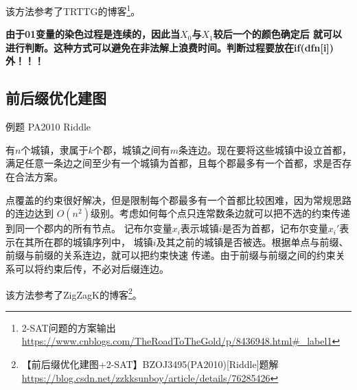 该方法参考了TRTTG的博客\footnote{2-SAT问题的方案输出
\url{https://www.cnblogs.com/TheRoadToTheGold/p/8436948.html\#\_label1}}。

{\bfseries 由于01变量的染色过程是连续的，因此当$X_0$与$X_1$较后一个的颜色确定后
就可以进行判断。这种方式可以避免在非法解上浪费时间。判断过程要放在if(dfn[i])外！！！}
\subsection{前后缀优化建图}
例题 PA2010 Riddle

有$n$个城镇，隶属于$k$个郡，城镇之间有$m$条连边。现在要将这些城镇中设立首都，
满足任意一条边之间至少有一个城镇为首都，且每个郡最多有一个首都，求是否存在合法方案。

点覆盖的约束很好解决，但是限制每个郡最多有一个首都比较困难，因为常规思路的连边达到
$O(n^2)$级别。考虑如何每个点只连常数条边就可以把不选的约束传递到同一个郡内的所有节点。
记布尔变量$x_i$表示城镇$i$是否为首都，记布尔变量$x_i'$表示在其所在郡的城镇序列中，
城镇$i$及其之前的城镇是否被选。根据单点与前缀、前缀与前缀的关系连边，就可以把约束快速
传递。由于前缀与前缀之间的约束关系可以将约束后传，不必对后缀连边。

该方法参考了ZigZagK的博客\footnote{
    【前后缀优化建图+2-SAT】BZOJ3495(PA2010)[Riddle]题解\\
    \url{https://blog.csdn.net/zzkksunboy/article/details/76285426}
}。
